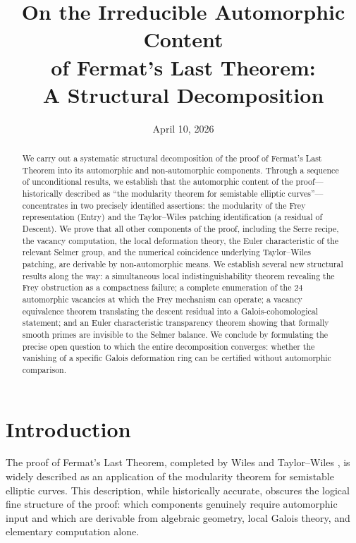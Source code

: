 \documentclass[12pt]{amsart}
\title[The Automorphic Content of Fermat's Last Theorem]{On the Irreducible Automorphic Content\\of Fermat's Last Theorem:\\A Structural Decomposition}
\author{}
\date{April 10, 2026}
\theoremstyle{definition}
\theoremstyle{remark}
\begin{document}
\begin{abstract}
We carry out a systematic structural decomposition of the proof of Fermat's Last Theorem into its automorphic and non-automorphic components. Through a sequence of unconditional results, we establish that the automorphic content of the proof---historically described as ``the modularity theorem for semistable elliptic curves''---concentrates in two precisely identified assertions: the modularity of the Frey representation (Entry) and the Taylor--Wiles patching identification (a residual of Descent). We prove that all other components of the proof, including the Serre recipe, the vacancy computation, the local deformation theory, the Euler characteristic of the relevant Selmer group, and the numerical coincidence underlying Taylor--Wiles patching, are derivable by non-automorphic means. We establish several new structural results along the way: a simultaneous local indistinguishability theorem revealing the Frey obstruction as a compactness failure; a complete enumeration of the 24 automorphic vacancies at which the Frey mechanism can operate; a vacancy equivalence theorem translating the descent residual into a Galois-cohomological statement; and an Euler characteristic transparency theorem showing that formally smooth primes are invisible to the Selmer balance. We conclude by formulating the precise open question to which the entire decomposition converges: whether the vanishing of a specific Galois deformation ring can be certified without automorphic comparison.
\end{abstract}

\maketitle

\tableofcontents

\section{Introduction}

The proof of Fermat's Last Theorem, completed by Wiles \cite{Wiles} and Taylor--Wiles \cite{TW}, is widely described as an application of the modularity theorem for semistable elliptic curves. This description, while historically accurate, obscures the logical fine structure of the proof: which components genuinely require automorphic input and which are derivable from algebraic geometry, local Galois theory, and elementary computation alone.
\end{document}
